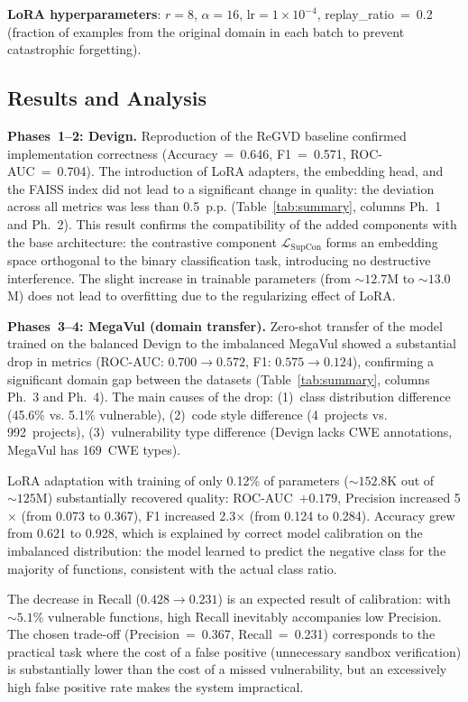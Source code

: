 \documentclass[runningheads]{llncs}
\begin{document}
\textbf{LoRA hyperparameters}: $r = 8$, $\alpha = 16$, $\text{lr} = 1 \times 10^{-4}$, replay\_ratio~=~0.2 (fraction of examples from the original domain in each batch to prevent catastrophic forgetting).


\subsection{Results and Analysis}

\textbf{Phases~1--2: Devign.}
Reproduction of the ReGVD baseline confirmed implementation correctness (Accuracy~=~0.646, F1~=~0.571, ROC-AUC~=~0.704). The introduction of LoRA adapters, the embedding head, and the FAISS index did not lead to a significant change in quality: the deviation across all metrics was less than 0.5~p.p. (Table~\ref{tab:summary}, columns Ph.~1 and Ph.~2). This result confirms the compatibility of the added components with the base architecture: the contrastive component $\mathcal{L}_{\text{SupCon}}$ forms an embedding space orthogonal to the binary classification task, introducing no destructive interference. The slight increase in trainable parameters (from ${\sim}12.7$M to ${\sim}13.0$M) does not lead to overfitting due to the regularizing effect of LoRA.

\textbf{Phases~3--4: MegaVul (domain transfer).}
Zero-shot transfer of the model trained on the balanced Devign to the imbalanced MegaVul showed a substantial drop in metrics (ROC-AUC: $0.700 \to 0.572$, F1: $0.575 \to 0.124$), confirming a significant domain gap between the datasets (Table~\ref{tab:summary}, columns Ph.~3 and Ph.~4). The main causes of the drop: (1)~class distribution difference (45.6\% vs. 5.1\% vulnerable), (2)~code style difference (4~projects vs. 992~projects), (3)~vulnerability type difference (Devign lacks CWE annotations, MegaVul has 169~CWE types).

LoRA adaptation with training of only 0.12\% of parameters (${\sim}152.8$K out of ${\sim}125$M) substantially recovered quality: ROC-AUC~$+0.179$, Precision increased 5$\times$ (from 0.073 to 0.367), F1 increased 2.3$\times$ (from 0.124 to 0.284). Accuracy grew from 0.621 to 0.928, which is explained by correct model calibration on the imbalanced distribution: the model learned to predict the negative class for the majority of functions, consistent with the actual class ratio.

The decrease in Recall ($0.428 \to 0.231$) is an expected result of calibration: with ${\sim}5.1$\% vulnerable functions, high Recall inevitably accompanies low Precision. The chosen trade-off (Precision~=~0.367, Recall~=~0.231) corresponds to the practical task where the cost of a false positive (unnecessary sandbox verification) is substantially lower than the cost of a missed vulnerability, but an excessively high false positive rate makes the system impractical.
\end{document}

